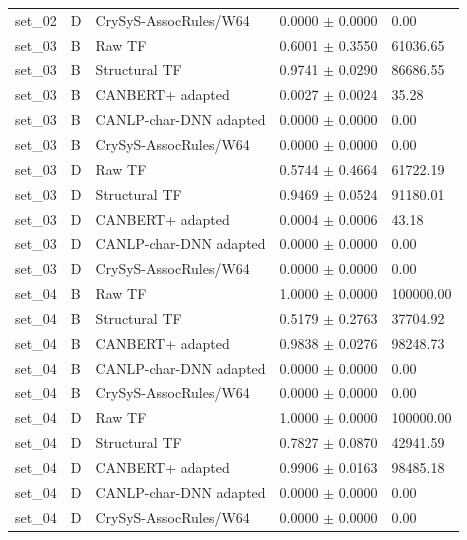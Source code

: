 \documentclass[12pt,a4paper,oneside,openany]{extbook}
\begin{document}
\begin{longtable}{P{1.6cm}P{1.2cm}P{4.0cm}P{3.5cm}P{2.2cm}}
set\_02 & D & CrySyS-AssocRules/W64 & 0.0000 $\pm$ 0.0000 & 0.00\\
set\_03 & B & Raw TF & 0.6001 $\pm$ 0.3550 & 61036.65\\
set\_03 & B & Structural TF & 0.9741 $\pm$ 0.0290 & 86686.55\\
set\_03 & B & CANBERT+ adapted & 0.0027 $\pm$ 0.0024 & 35.28\\
set\_03 & B & CANLP-char-DNN adapted & 0.0000 $\pm$ 0.0000 & 0.00\\
set\_03 & B & CrySyS-AssocRules/W64 & 0.0000 $\pm$ 0.0000 & 0.00\\
set\_03 & D & Raw TF & 0.5744 $\pm$ 0.4664 & 61722.19\\
set\_03 & D & Structural TF & 0.9469 $\pm$ 0.0524 & 91180.01\\
set\_03 & D & CANBERT+ adapted & 0.0004 $\pm$ 0.0006 & 43.18\\
set\_03 & D & CANLP-char-DNN adapted & 0.0000 $\pm$ 0.0000 & 0.00\\
set\_03 & D & CrySyS-AssocRules/W64 & 0.0000 $\pm$ 0.0000 & 0.00\\
set\_04 & B & Raw TF & 1.0000 $\pm$ 0.0000 & 100000.00\\
set\_04 & B & Structural TF & 0.5179 $\pm$ 0.2763 & 37704.92\\
set\_04 & B & CANBERT+ adapted & 0.9838 $\pm$ 0.0276 & 98248.73\\
set\_04 & B & CANLP-char-DNN adapted & 0.0000 $\pm$ 0.0000 & 0.00\\
set\_04 & B & CrySyS-AssocRules/W64 & 0.0000 $\pm$ 0.0000 & 0.00\\
set\_04 & D & Raw TF & 1.0000 $\pm$ 0.0000 & 100000.00\\
set\_04 & D & Structural TF & 0.7827 $\pm$ 0.0870 & 42941.59\\
set\_04 & D & CANBERT+ adapted & 0.9906 $\pm$ 0.0163 & 98485.18\\
set\_04 & D & CANLP-char-DNN adapted & 0.0000 $\pm$ 0.0000 & 0.00\\
set\_04 & D & CrySyS-AssocRules/W64 & 0.0000 $\pm$ 0.0000 & 0.00\\
\bottomrule\end{longtable}
\end{document}
